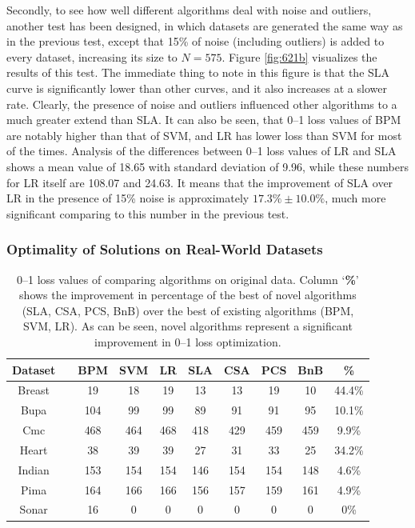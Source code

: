 Secondly, to see how well different algorithms deal with noise and outliers, another test has been designed, in which datasets are generated the same way as in the previous test, except that 15\% of noise (including outliers) is added to every dataset, increasing its size to $N=575$. Figure \ref{fig:621b} visualizes the results of this test. The immediate thing to note in this figure is that the SLA curve is significantly lower than other curves, and it also increases at a slower rate. Clearly, the presence of noise and outliers influenced other algorithms to a much greater extend than SLA. It can also be seen, that 0--1 loss values of BPM are notably higher than that of SVM, and LR has lower loss than SVM for most of the times. Analysis of the differences between 0--1 loss values of LR and SLA shows a mean value of 18.65 with standard deviation of 9.96, while these numbers for LR itself are 108.07 and 24.63. It means that the improvement of SLA over LR in the presence of 15\% noise is approximately $17.3\% \pm 10.0\%$, much more significant comparing to this number in the previous test.   


\subsubsection{Optimality of Solutions on Real-World Datasets}
\label{ssec:rc.optimality2}

\begin{table}[htbp!]
\centering
\begin{tabular}{|cc|  ccc|cccc|c|}
\hline\hline
{\bf Dataset} && {\bf BPM} & {\bf SVM} & {\bf LR} & {\bf SLA} & {\bf CSA} & {\bf PCS} & {\bf BnB} & {\bf \% }\\ 
\hline 
Breast	&& 19 & 18 & 19 & 13 		& 13 & 19 & 10 & 44.4\%\\  
Bupa		&& 104 & 99 & 99 & 89 		& 91 & 91 & 95 & 10.1\%\\   
Cmc		&& 468 & 464 & 468 & 418 	& 429 & 459 & 459 & 9.9\%\\   
Heart  	&& 38 & 39 & 39 & 27 		& 31 & 33 & 25 & 34.2\%\\  
Indian  	&& 153 & 154 & 154 & 146 	& 154 & 154 & 148 & 4.6\%\\    
Pima 	&& 164 & 166 & 166 & 156 	& 157 & 159 & 161 & 4.9\%\\    
Sonar  	&& 16 & 0 & 0 & 0 			& 0 & 0 & 0 & 0\%\\ 
\hline\hline
\end{tabular}
\caption{0--1 loss values of comparing algorithms on original data. Column `{\bf \%}' shows the improvement in percentage of the best of novel algorithms (SLA, CSA, PCS, BnB) over the best of existing algorithms (BPM, SVM, LR). As can be seen, novel algorithms represent a significant improvement in 0--1 loss optimization.} 
\label{tab:losses0noise}
\end{table}

